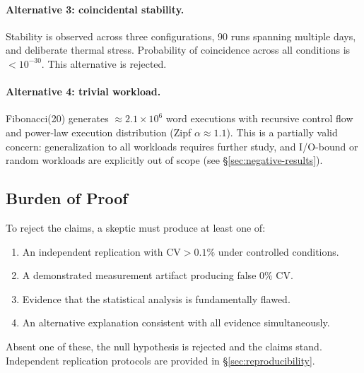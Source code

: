 \paragraph{Alternative 3: coincidental stability.}
Stability is observed across three configurations, 90 runs spanning multiple
days, and deliberate thermal stress. Probability of coincidence across all
conditions is $< 10^{-30}$. This alternative is rejected.

\paragraph{Alternative 4: trivial workload.}
Fibonacci(20) generates $\approx 2.1 \times 10^6$ word executions with
recursive control flow and power-law execution distribution (Zipf $\alpha
\approx 1.1$). This is a partially valid concern: generalization to all
workloads requires further study, and I/O-bound or random workloads are
explicitly out of scope (see \S\ref{sec:negative-results}).

\subsection{Burden of Proof}

To reject the claims, a skeptic must produce at least one of:
\begin{enumerate}
  \item An independent replication with $\text{CV} > 0.1\%$ under controlled
    conditions.
  \item A demonstrated measurement artifact producing false 0\% CV.
  \item Evidence that the statistical analysis is fundamentally flawed.
  \item An alternative explanation consistent with all evidence simultaneously.
\end{enumerate}

Absent one of these, the null hypothesis is rejected and the claims stand.
Independent replication protocols are provided in \S\ref{sec:reproducibility}.
